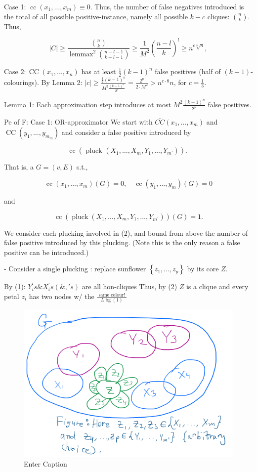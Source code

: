 Case 1: $\operatorname{cc}\left(x_1, \ldots, x_m\right) \equiv 0$.
Thus, the number of false negatives introduced is the total of all possible positive-instance, namely all possible $k-c$ cliques: $\binom{n}{k}$.
Thus,

$$
|C| \geqslant \frac{\binom{n}{k}}{\operatorname{lemmax}^2\binom{n-l-1}{k-l-1}} \geqslant \frac{1}{M^2}\left(\frac{n-l}{k}\right)^l \geqslant n^{c \sqrt[8]{n}},
$$


Case $2: \operatorname{CC}\left(x_1, \ldots, x_n\right)$ has at least $\frac{1}{2}(k-1)^n$ false positives (half of $(k-1)$-colourings).
By Lemma 2: $|c| \geqslant \frac{\frac{1}{2}(k-1)^n}{M^2 \frac{(k-1)^n}{2^p}}=\frac{2^p}{2 \cdot M^2}>n^{c \cdot 8} n$, for $c=\frac{1}{3}$.



Lemma 1: Each approximation step introduces at most $M^2 \frac{(k-1)^n}{2^p}$ false positives.

Pe of F: Case 1: OR-approximator
We start with $\overline{C C}\left(x_1, \ldots, x_m\right)$ and $\operatorname{CC}\left(y_1, \ldots, y_{m_m}\right)$ and consider a false positive introduced by

$$
\operatorname{cc}\left(\text { pluck }\left(X_1, \ldots, X_m, Y_1, \ldots, Y_{m^{\prime}}\right)\right) \text {. }
$$


That is, a $G=(v, E)$ s.t.,

$$
\operatorname{cc}\left(x_1, \ldots, x_m\right)(G)=0, \quad \operatorname{cc}\left(y_1, \ldots, y_m\right)(G)=0
$$

and

$$
\operatorname{cc}\left(\operatorname{pluck}\left(X_1, \ldots, X_m, Y_1, \ldots, Y_{m^{\prime}}\right)\right)(G)=1 .
$$


We consider each plucking involved in (2), and bound from above the number of false positive introduced by this plucking. (Note this is the only reason a false positive can be introduced.)


 - Consider a single plucking : replace sunflower $\left\{z_1, \ldots, z_p\right\}$ by its core $Z$.

By (1): $Y_i^{\prime} s \& X_i^{\prime} s(\&, ' s)$
are all hon-cliques
Thus, by (2)
$Z$ is a clique
and every petal $z_i$
has two nodes w/ the $\frac{\text { same colour! }}{L \operatorname{bg}(1)}$



\begin{figure}[H]
    \centering
    \includegraphics[width=.6\linewidth]{images/clique3.png}
    \caption{Enter Caption}
    \label{fig:enter-label}
\end{figure}



